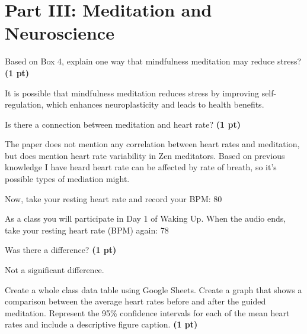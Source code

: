 \documentclass[12pt,a4paper]{article}
\begin{document}
\section*{Part III: Meditation and Neuroscience}
\begin{enumerate}[font=\bfseries, wide, resume]
    {\color{under}\item Based on Box 4, explain one way that mindfulness meditation may reduce stress? \textbf{(1 pt)}}
    
    It is possible that mindfulness meditation reduces stress by improving self-regulation, which enhances neuroplasticity and leads to health benefits.

    {\color{under}\item Is there a connection between meditation and heart rate? \textbf{(1 pt)}}
    
    The paper does not mention any correlation between heart rates and meditation, but does mention heart rate variability in Zen meditators. Based on previous knowledge I have heard heart rate can be affected by rate of breath, so it's possible types of mediation might.

    {\color{under}\item Now, take your resting heart rate and record your BPM: {\color{darkmodetext} 80}
    
    As a class you will participate in Day 1 of Waking Up.  When the audio ends, take your resting heart rate (BPM) again: {\color{darkmodetext} 78}

    Was there a difference? \textbf{(1 pt)}}

    Not a significant difference.
    
    \newpage

    {\color{under}\item Create a whole class data table using Google Sheets. Create a graph that shows a comparison between the average heart rates before and after the guided meditation. Represent the 95\% confidence intervals for each of the mean heart rates and include a descriptive figure caption. \textbf{(1 pt)}}
    

\end{enumerate}
\end{document}
